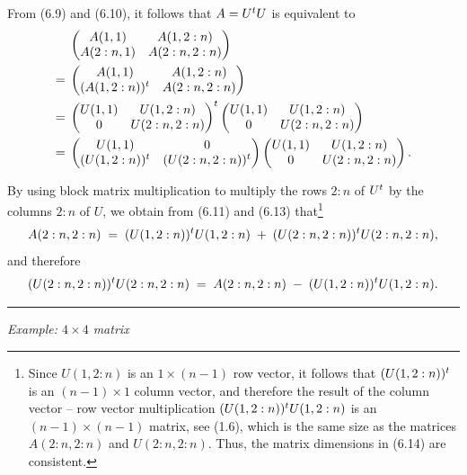 From (6.9) and (6.10), it follows that $A = U^{t} U$ is equivalent to
\begin{align}
& \begin{pmatrix} A(1,1) & A(1,2:n) \\ A(2:n,1) & A(2:n,2:n) \end{pmatrix} \\
= \;& \begin{pmatrix} A(1,1) & A(1,2:n) \\ (A(1,2:n))^{t} & A(2:n,2:n) \end{pmatrix} \\
= \;& \begin{pmatrix} U(1,1) & U(1,2:n) \\ 0 & U(2:n,2:n) \end{pmatrix}^{t}
\begin{pmatrix} U(1,1) & U(1,2:n) \\ 0 & U(2:n,2:n) \end{pmatrix} \notag \\
= \;& \begin{pmatrix} U(1,1) & 0 \\ (U(1,2:n))^{t} & (U(2:n,2:n))^{t} \end{pmatrix}
\begin{pmatrix} U(1,1) & U(1,2:n) \\ 0 & U(2:n,2:n) \end{pmatrix}.
\end{align}

By using block matrix multiplication to multiply the rows $2:n$ of $U^{t}$ by the
columns $2:n$ of $U$, we obtain from (6.11) and (6.13) that\footnote{Since
$U(1,2:n)$ is an $1 \times (n-1)$ row vector, it follows that $(U(1,2:n))^{t}$ is an
$(n-1) \times 1$ column vector, and therefore the result of the column vector -- row
vector multiplication $(U(1,2:n))^{t} U(1,2:n)$ is an $(n-1) \times (n-1)$ matrix, see
(1.6), which is the same size as the matrices $A(2:n,2:n)$ and $U(2:n,2:n)$. Thus, the
matrix dimensions in (6.14) are consistent.}
\begin{equation}
A(2:n,2:n) \;=\; (U(1,2:n))^{t} U(1,2:n) \;+\; (U(2:n,2:n))^{t} U(2:n,2:n),
\end{equation}
and therefore
\begin{equation}
(U(2:n,2:n))^{t} U(2:n,2:n) \;=\; A(2:n,2:n) \;-\; (U(1,2:n))^{t} U(1,2:n).
\end{equation}

\medskip
\noindent\rule{\linewidth}{0.4pt}

\noindent\textit{Example: $4 \times 4$ matrix}

